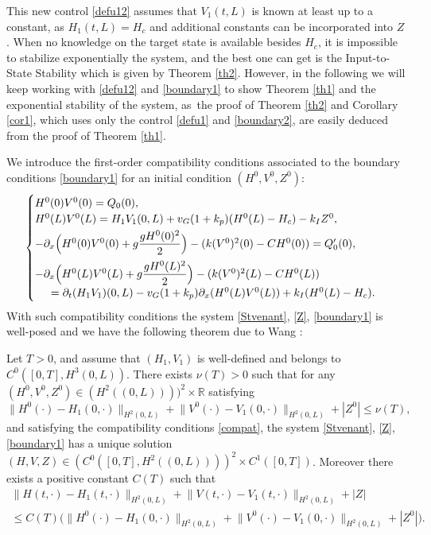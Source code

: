 This new control \eqref{defu12} assumes that $V_{1}(t,L)$ is known at least up to a constant, as $H_{1}(t,L)=H_{c}$ and additional constants can be incorporated into $Z$.
When no knowledge on the target state is available besides $H_{c}$,
it is impossible to stabilize exponentially the system, and the best one can get is the Input-to-State Stability which is given by Theorem \ref{th2}.
However, in the following we will keep working with \eqref{defu12} and \eqref{boundary1} to show Theorem \ref{th1} and the exponential stability of the system, as~the proof of Theorem \ref{th2} and Corollary \ref{cor1}, which uses only the control \eqref{defu1} and \eqref{boundary2}, are easily deduced from the proof of Theorem \ref{th1}.

We introduce the first-order compatibility conditions associated to the boundary conditions \eqref{boundary1} for an initial condition $(H^{0},V^{0},Z^{0})$:
\begin{equation}\label{compat}
\begin{cases}
H^{0}(0)V^{0}(0)=Q_{0}(0),\\
H^{0}(L)V^{0}(L)=H_{1}V_{1}(0,L)+v_{G}(1+k_{p})(H^{0}(L)-H_{c})-k_{I}Z^{0},\\[3pt]
-\partial_{x}\Bigl(H^{0}(0)V^{0}(0)+g\dfrac{gH^{0}(0)^{2}}{2}\Bigr)-(k(V^{0})^{2}(0)-CH^{0}(0))=Q'_{0}(0),\\[8pt]
-\partial_{x}\Bigl(H^{0}(L)V^{0}(L)+g\dfrac{gH^{0}(L)^{2}}{2}\Bigr)-(k(V^{0})^{2}(L)-CH^{0}(L))\\
\hspace*{.5cm}=\partial_{t}(H_{1}V_{1})(0,L)
-v_{G}(1+k_{p})\partial_{x}(H^{0}(L)V^{0}(L))+k_{I}(H^{0}(L)-H_{c}).
\end{cases}
\end{equation}
With such compatibility conditions the system \eqref{Stvenant}, \eqref{Z}, \eqref{boundary1} is well-posed and we have the following theorem due to Wang \cite[Th.\,2.1]{Wang}:
\begin{thm}\label{th0}
Let $T>0$, and assume that
$(H_{1},V_{1})$ is well-defined and belongs to $C^{0}([0,T],H^{3}(0,L))$.
There exists $\nu(T)>0$
such that for any $(H^{0},V^{0},Z^{0})\in (H^{2}((0,L))))^{2}\times \mathbb{R}$ satisfying
\begin{equation*}
\lVert H^{0}(\cdot)-H_{1}(0,\cdot)\rVert_{H^{2}(0,L)}+\lVert V^{0}(\cdot)-V_{1}(0,\cdot)\rVert_{H^{2}(0,L)}+|Z^{0}|\leq \nu(T),
\end{equation*}
and satisfying the compatibility conditions \eqref{compat}, the system \eqref{Stvenant}, \eqref{Z}, \eqref{boundary1} has a unique solution $(H,V,Z)\in (C^{0}([0,T],H^{2}((0,L))))^{2}\times C^{1}([0,T])$. Moreover
there exists a positive constant $C(T)$ such that
\begin{multline}
\label{estimate}
\lVert H(t,\cdot)-H_{1}(t,\cdot)\rVert_{H^{2}(0,L)}+\lVert V(t,\cdot)-V_{1}(t,\cdot)\rVert_{H^{2}(0,L)}+|Z|\\
\leq C(T)\bigl(\lVert H^{0}(\cdot)-H_{1}(0,\cdot)\rVert_{H^{2}(0,L)}+\lVert V^{0}(\cdot)-V_{1}(0,\cdot)\rVert_{H^{2}(0,L)}+|Z^{0}|\bigr).
\end{multline}
\end{thm}

